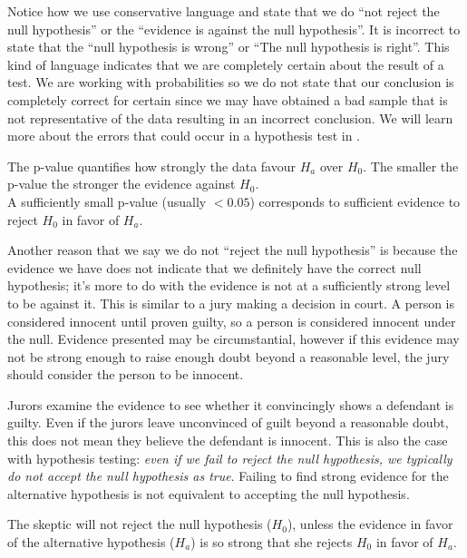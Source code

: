 Notice how we use conservative language and state that we do ``not reject the null hypothesis'' or the 
``evidence is against the null hypothesis''.
It is incorrect to state that the ``null hypothesis is wrong'' or ``The null hypothesis is right''.
This kind of language indicates that we are completely certain about the result of a test.
We are working with probabilities so we do not state that our conclusion is completely correct for certain 
since we may have obtained a bad sample that is not representative of the data resulting in 
an incorrect conclusion.
We will learn more about the errors that could occur in a hypothesis test in
{\color{red}{Chapter ???}}.


\begin{termBox}{
The p-value quantifies how strongly the data favour $H_a$ over $H_0$. 
The smaller the p-value the stronger the evidence against $H_0$.\\

A sufficiently small p-value (usually $<0.05$) corresponds to sufficient evidence to reject $H_0$ in favor of $H_a$.}
\end{termBox}

Another reason that we say we do not ``reject the null hypothesis'' is because 
the evidence we have does not indicate that we definitely have the correct null hypothesis;
it's more to do with the evidence is not at a sufficiently strong level to be against it.
This is similar to a jury making a decision in court.
A person is considered innocent until proven guilty, so a person is considered innocent under the null.
Evidence presented may be circumstantial, however if this evidence may not be strong enough to raise 
enough doubt beyond a reasonable level, the jury should consider the person to be innocent.

Jurors examine the evidence to see whether it convincingly shows a defendant is guilty. Even if the jurors leave unconvinced of guilt beyond a reasonable doubt, this does not mean they believe the defendant is innocent. This is also the case with hypothesis testing: \emph{even if we fail to reject the null hypothesis, we typically do not accept the null hypothesis as true}. Failing to find strong evidence for the alternative hypothesis is not equivalent to accepting the null hypothesis.

\begin{tipBox}{
The skeptic will not reject the null hypothesis ($H_0$), unless the evidence in favor of the alternative hypothesis ($H_a$) is so strong that she rejects $H_0$ in favor of $H_a$.}
\end{tipBox}


